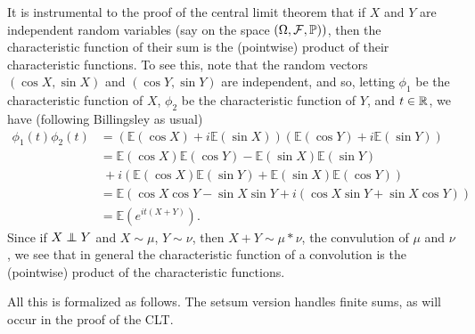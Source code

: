 \documentclass[leqno]{article}
\theoremstyle{definition}
\renewcommand{\E}{\mathbb E}
\newcommand\indep{\protect\mathpalette{\protect\independenT}{\perp}}
\def\independenT#1#2{\mathrel{\rlap{$#1#2$}\mkern2mu{#1#2}}}
\begin{document}
\medskip

It is instrumental to the proof of the central limit theorem that if $X$ and $Y$ are independent random variables (say on the space $(\Omega, \mathcal F, \P))$, then the characteristic function of their sum is the (pointwise) product of their characteristic functions. To see this, note that the random vectors $(\cos X, \sin X)$ and $(\cos Y, \sin Y)$ are independent, and so, letting $\phi_1$ be the characteristic function of $X$, $\phi_2$ be the characteristic function of $Y$, and $t \in \R$, we have (following Billingsley \cite{billingsley} as usual)
\begin{align*}
\phi_1(t)\phi_2(t) &= (\E(\cos X) + i\E(\sin X))(\E(\cos Y) + i\E(\sin Y)) \\
                   &= \E(\cos X) \E(\cos Y) - \E(\sin X)\E(\sin Y) \\
                   & \ + i(\E(\cos X)\E(\sin Y) + \E(\sin X)\E(\cos Y)) \\
                   &= \E(\cos X \cos Y - \sin X \sin Y + i(\cos X \sin Y + \sin X \cos Y)) \\
                   &= \E(e^{it(X + Y)}).
\end{align*}
Since if $X \indep Y$ and $X \sim \mu$, $Y \sim \nu$, then $X + Y \sim \mu * \nu$, the convulution of $\mu$ and $\nu$, we see that in general the characteristic function of a convolution is the (pointwise) product of the characteristic functions.

All this is formalized as follows. The setsum version handles finite sums, as will occur in the proof of the CLT.\phantom{)}

\medskip
\end{document}

